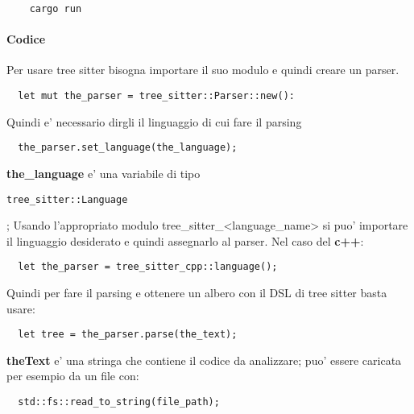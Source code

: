 \begin{verbatim}
	cargo run
\end{verbatim}

\paragraph{Codice}

Per usare tree sitter bisogna importare il suo modulo e quindi creare un parser.

\begin{verbatim}
  let mut the_parser = tree_sitter::Parser::new():
\end{verbatim}

Quindi e' necessario dirgli il linguaggio di cui fare il parsing

\begin{verbatim}
  the_parser.set_language(the_language);
\end{verbatim}

\textbf{the_language} e' una variabile di tipo \begin{verbatim}tree_sitter::Language\end{verbatim};
Usando l'appropriato modulo tree_sitter_<language_name> si puo' importare il linguaggio desiderato e quindi assegnarlo al parser.
Nel caso del \textbf{c++}:

\begin{verbatim}
  let the_parser = tree_sitter_cpp::language();
\end{verbatim}

Quindi per fare il parsing e ottenere un albero con il DSL di tree sitter basta usare:

\begin{verbatim}
  let tree = the_parser.parse(the_text);
\end{verbatim}

\textbf{theText} e' una stringa che contiene il codice da analizzare; puo' essere caricata per esempio da un file con:

\begin{verbatim}
  std::fs::read_to_string(file_path);
\end{verbatim}
